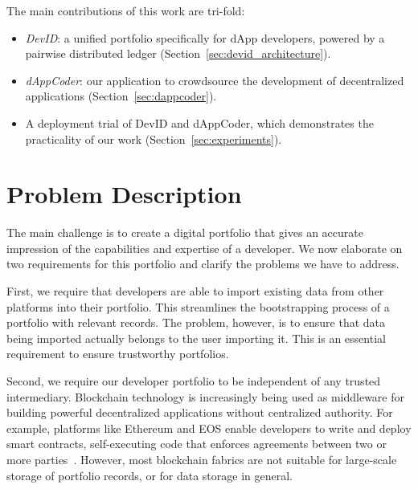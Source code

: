 The main contributions of this work are tri-fold:
\begin{itemize}
	\item \emph{DevID}: a unified portfolio specifically for dApp developers, powered by a pairwise distributed ledger (Section~\ref{sec:devid_architecture}).
	\item \emph{dAppCoder}: our application to crowdsource the development of decentralized applications (Section~\ref{sec:dappcoder}).
	\item A deployment trial of DevID and dAppCoder, which demonstrates the practicality of our work (Section~\ref{sec:experiments}).
\end{itemize}

\section{Problem Description}
\label{sec:problem_description}
The main challenge is to create a digital portfolio that gives an accurate impression of the capabilities and expertise of a developer.
We now elaborate on two requirements for this portfolio and clarify the problems we have to address.

First, we require that developers are able to import existing data from other platforms into their portfolio.
This streamlines the bootstrapping process of a portfolio with relevant records.
The problem, however, is to ensure that data being imported actually belongs to the user importing it.
This is an essential requirement to ensure trustworthy portfolios.

Second, we require our developer portfolio to be independent of any trusted intermediary.
Blockchain technology is increasingly being used as middleware for building powerful decentralized applications without centralized authority.
For example, platforms like Ethereum and EOS enable developers to write and deploy smart contracts, self-executing code that enforces agreements between two or more parties~\cite{szabo1997formalizing}.
However, most blockchain fabrics are not suitable for large-scale storage of portfolio records, or for data storage in general.

